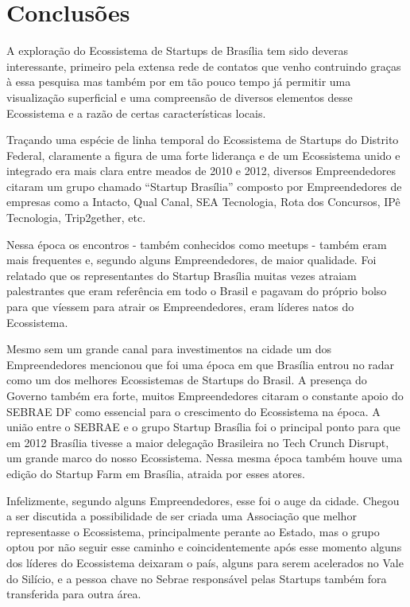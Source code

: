\chapter[Conclusões Pré-Eliminares]{Conclusões}
\label{cap-conclusoes}

A exploração do Ecossistema de Startups de Brasília tem sido deveras interessante, primeiro pela extensa rede de contatos que venho contruindo graças à essa pesquisa mas também por em tão pouco tempo já permitir uma visualização superficial e uma compreensão de diversos elementos desse Ecossistema e a razão de certas características locais.

Traçando uma espécie de linha temporal do Ecossistema de Startups do Distrito Federal, claramente a figura de uma forte liderança e de um Ecossistema unido e integrado era mais clara entre meados de 2010 e 2012, diversos Empreendedores citaram um grupo chamado ``Startup Brasília'' composto por Empreendedores de empresas como a Intacto, Qual Canal, SEA Tecnologia, Rota dos Concursos, IPê Tecnologia, Trip2gether, etc. 

Nessa época os encontros - também conhecidos como meetups - também eram mais frequentes e, segundo alguns Empreendedores, de maior qualidade. Foi relatado que os representantes do Startup Brasília muitas vezes atraiam palestrantes que eram referência em todo o Brasil e pagavam do próprio bolso para que víessem para atrair os Empreendedores, eram líderes natos do Ecossistema.

Mesmo sem um grande canal para investimentos na cidade um dos Empreendedores mencionou que foi uma época em que Brasília entrou no radar como um dos melhores Ecossistemas de Startups do Brasil. A presença do Governo também era forte, muitos Empreendedores citaram o constante apoio do SEBRAE DF como essencial para o crescimento do Ecossistema na época. A união entre o SEBRAE e o grupo Startup Brasília foi o principal ponto para que em 2012 Brasília tivesse a maior delegação Brasileira no Tech Crunch Disrupt, um grande marco do nosso Ecossistema. Nessa mesma época também houve uma edição do Startup Farm em Brasília, atraida por esses atores.

Infelizmente, segundo alguns Empreendedores, esse foi o auge da cidade. Chegou a ser discutida a possibilidade de ser criada uma Associação que melhor representasse o Ecossistema, principalmente perante ao Estado, mas o grupo optou por não seguir esse caminho e coincidentemente após esse momento alguns dos líderes do Ecossistema deixaram o país, alguns para serem acelerados no Vale do Silício, e a pessoa chave no Sebrae responsável pelas Startups também fora transferida para outra área. 

